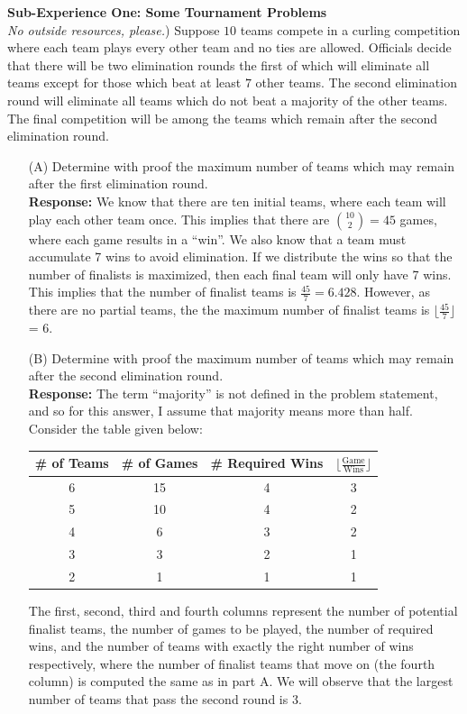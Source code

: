 \documentclass{article}
\newcommand{\response}[1]{\leavevmode\\[0.05in]{\bf Response: } #1 \leavevmode\\[0.05in]}
\begin{document}
\noindent \maltese \hspace{1ex} {\bf Sub-Experience One: Some Tournament Problems}\\[1em]
 \emph{No outside resources, please.}) Suppose $10$ teams compete in a curling competition where each team plays every other team and no ties are allowed.  Officials decide that there will be two elimination rounds the first of which will eliminate all teams except for those which beat at least $7$ other teams.  The second elimination round will eliminate all teams which do not beat a majority of the other teams. The final competition will be among the teams which remain after the second elimination round.  
\begin{enumerate} 
	\item[(A)] Determine with proof the maximum number of teams which may remain after the first elimination round.  
		\response{We know that there are ten initial teams, where each team will play each other team once.  This implies that there are ${10 \choose 2} = 45$ games, where each game results in a ``win''. We also know that a team must accumulate 7 wins to avoid elimination. If we distribute the wins so that the number of finalists is maximized, then each final team will only have 7 wins.  This implies that the number of finalist teams is $\frac{45}{7} = 6.428$. However, as there are no partial teams, the the maximum number of finalist teams is $\lfloor \frac{45}{7} \rfloor$ = 6.}  
	\item[(B)] Determine with proof the maximum number of teams which may remain after the second elimination round.  
		\response{The term ``majority'' is not defined in the problem statement, and so for this answer, I assume that majority means more than half. Consider the table given below:\\
		\begin{center}
		\begin{tabular}{|c | c | c | c |}
			\# of Teams & \# of Games & \# Required Wins &$\lfloor \frac{\text{Game}}{\text{Wins}}\rfloor$\\ \hline
			6 & 15 & 4 & 3\\
			5 & 10 & 4 & 2\\
			4 & 6 & 3 & 2\\
			3 & 3 & 2 & 1\\
			2 & 1 & 1 & 1\\
		\end{tabular}
		\end{center}
		The first, second, third and fourth columns represent the number of potential finalist teams, the number of games to be played, the number of required wins, and the number of teams with exactly the right number of wins respectively, where the number of finalist teams that move on (the fourth column) is computed the same as in part A. We will observe that the largest number of teams that pass the second round is $3$.}
\end{enumerate} 
\end{document}
